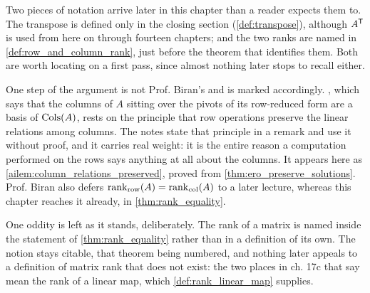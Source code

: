 \begin{ainote}
Two pieces of notation arrive later in this chapter than a reader expects them
to. The transpose is defined only in the closing section
(\cref{def:transpose}), although $A^{\mathsf{T}}$ is used from here on through
fourteen chapters; and the two ranks are named in
\cref{def:row_and_column_rank}, just before the theorem that identifies them.
Both are worth locating on a first pass, since almost nothing later stops to
recall either.

One step of the argument is not Prof. Biran's and is marked accordingly.
, which says that the columns of $A$ sitting over the
pivots of its row-reduced form are a basis of $\operatorname{Cols}(A)$, rests on the principle
that row operations preserve the linear relations among columns. The notes state
that principle in a remark and use it without proof, and it carries real weight:
it is the entire reason a computation performed on the rows says anything at all
about the columns. It appears here as
\cref{ailem:column_relations_preserved}, proved from
\cref{thm:ero_preserve_solutions}. Prof. Biran also defers
$\operatorname{rank}_{\text{row}}(A) = \operatorname{rank}_{\text{col}}(A)$ to a later lecture, whereas this chapter reaches it
already, in \cref{thm:rank_equality}.

One oddity is left as it stands, deliberately. The rank of a matrix is named
inside the statement of \cref{thm:rank_equality} rather than in a definition of
its own. The notion stays citable, that theorem being numbered, and nothing
later appeals to a definition of matrix rank that does not exist: the two places
in ch. 17c that say  mean the rank of a linear
map, which \cref{def:rank_linear_map} supplies.
\end{ainote}
